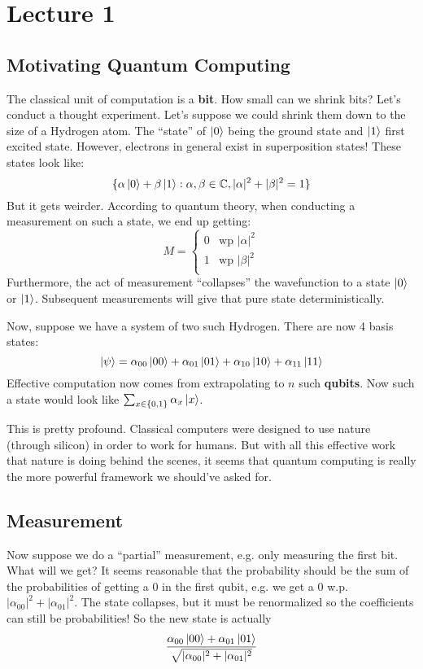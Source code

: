 
\section{Lecture 1}

\subsection{Motivating Quantum Computing}
The classical unit of computation is a \textbf{bit}. How small can we shrink bits? Let's conduct a thought experiment. Let's suppose we could shrink them down to the size of a Hydrogen atom. The ``state''
of $\ket{0}$ being the ground state and $\ket{1}$ first excited state. However, electrons in general exist in superposition states! These states look like:
\[ \{ \alpha \ket{0} + \beta \ket{1}: \alpha, \beta \in \operatorname{\mathbb{C}}, |\alpha|^2 + |\beta|^2 = 1 \} \]
But it gets weirder. According to quantum theory, when conducting a measurement on such a state, we end up getting:
\[ M = \begin{cases}
   0 & \text{wp } |\alpha|^2 \\
    1 & \text{wp } |\beta|^2 \\
\end{cases} \]
Furthermore, the act of measurement ``collapses'' the wavefunction to a state $\ket{0}$ or $\ket{1}$. Subsequent measurements will give that pure state deterministically.

Now, suppose we have a system of two such Hydrogen. There are now 4 basis states:
\[ \ket{\psi} = \alpha_{00} \ket{00} + \alpha_{01} \ket{01} + \alpha_{10} \ket{10} + \alpha_{11} \ket{11} \]
Effective computation now comes from extrapolating to $n$ such \textbf{qubits}. Now such a state would look like $\sum_{x \in \{0, 1\}} \alpha_x \ket{x}$.

This is pretty profound. Classical computers were designed to use nature (through silicon) in order to work for humans. But with all
this effective work that nature is doing behind the scenes, it seems that quantum computing is really the more powerful framework we should've asked for.

\subsection{Measurement}
Now suppose we do a ``partial'' measurement, e.g. only measuring the first bit. What will we get? It seems reasonable that the probability should be the sum of the probabilities of getting a 0 in the first qubit,
e.g. we get a 0 w.p. $|\alpha_{00}|^2 + |\alpha_{01}|^2$. The state collapses, but it must be renormalized so the coefficients can still be probabilities!
So the new state is actually \[\frac{\alpha_{00} \ket{00} + \alpha_{01} \ket{01}}{\sqrt{|\alpha_{00}|^2 + |\alpha_{01}|^2}}\]

